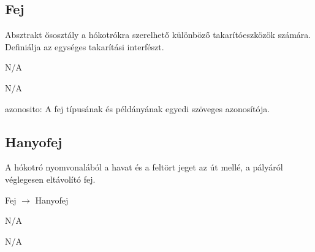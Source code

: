 \subsection{Fej}
\begin{class-template-responsibility}
    Absztrakt ősosztály a hókotrókra szerelhető különböző takarítóeszközök számára. Definiálja az egységes takarítási interfészt.
\end{class-template-responsibility}
\begin{class-template-baseclass}
    N/A
\end{class-template-baseclass}
\begin{class-template-interface}
    N/A
\end{class-template-interface}
\begin{class-template-attribute}
    azonosito: A fej típusának és példányának egyedi szöveges azonosítója.
\end{class-template-attribute}
\begin{class-template-method}
\end{class-template-method}

\subsection{Hanyofej}
\begin{class-template-responsibility}
    A hókotró nyomvonalából a havat és a feltört jeget az út mellé, a pályáról véglegesen eltávolító fej.
\end{class-template-responsibility}
\begin{class-template-baseclass}
    Fej $\rightarrow$ Hanyofej
\end{class-template-baseclass}
\begin{class-template-interface}
    N/A
\end{class-template-interface}
\begin{class-template-attribute}
    N/A
\end{class-template-attribute}
\begin{class-template-method}
\end{class-template-method}

